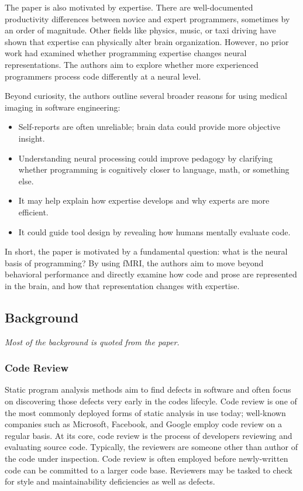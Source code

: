 The paper is also motivated by expertise. There are well-documented productivity differences between novice and expert programmers, sometimes by an order of magnitude. Other fields like physics, music, or taxi driving have shown that expertise can physically alter brain organization. However, no prior work had examined whether programming expertise changes neural representations. The authors aim to explore whether more experienced programmers process code differently at a neural level.

Beyond curiosity, the authors outline several broader reasons for using medical imaging in software engineering:

\begin{itemize}
    \item Self-reports are often unreliable; brain data could provide more objective insight.
    \item Understanding neural processing could improve pedagogy by clarifying whether programming is cognitively closer to language, math, or something else.
    \item It may help explain how expertise develops and why experts are more efficient.
    \item It could guide tool design by revealing how humans mentally evaluate code.
\end{itemize}

In short, the paper is motivated by a fundamental question: what is the neural basis of programming? By using fMRI, the authors aim to move beyond behavioral performance and directly examine how code and prose are represented in the brain, and how that representation changes with expertise.

\subsection{Background}
\textit{Most of the background is quoted from the paper.}
\subsubsection{Code Review}
Static program analysis methods aim to find defects in software and often focus on discovering those defects very early in the codes lifecyle. Code review is one of the most commonly deployed forms of static analysis in use today; well-known companies such as Microsoft, Facebook, and Google employ code review on a regular basis. At its core, code review is the process of developers reviewing and evaluating source code. Typically, the reviewers are someone other than author of the code under inspection. Code review is often employed before newly-written code can be committed to a larger code base. Reviewers may be tasked to check for style and maintainability deficiencies as well as defects.

